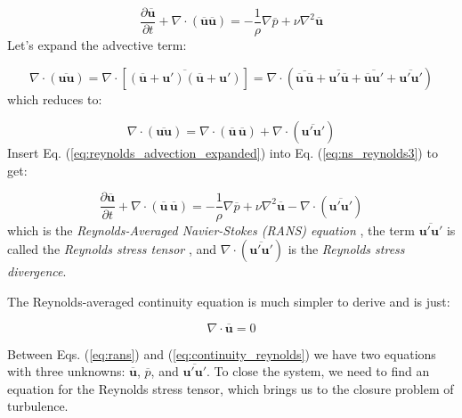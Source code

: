 \documentclass[12pt]{article}
\numberwithin{equation}{section}
\numberwithin{figure}{section}
\numberwithin{table}{section}
\begin{document}
\begin{equation}
  \frac{\partial \overline{\mathbf{u}}}{\partial t} +
  \nabla \cdot (\overline{\mathbf{u}} \overline{\mathbf{u}}) =
  - \frac{1}{\rho} \nabla \overline{p} + \nu \nabla^2 \overline{\mathbf{u}}
\end{equation}
Let's expand the advective term:

\begin{equation}
   \nabla \cdot (\overline{\mathbf{u} {\mathbf{u}}}) =
   \nabla \cdot [\overline{(\overline{\mathbf{u}} + \mathbf{u}')(\overline{\mathbf{u}} + \mathbf{u}')}] =
   \nabla \cdot (\overline{\overline{\mathbf{u}}\, \overline{\mathbf{u}}} + \overline{\mathbf{u}' \overline{\mathbf{u}}} + \overline{\overline{\mathbf{u}} \mathbf{u}'} + \overline{\mathbf{u}' \mathbf{u}'})
\end{equation}
which reduces to:

\begin{equation}
  \nabla \cdot (\overline{\mathbf{u} \mathbf{u}}) =
  \nabla \cdot (\overline{\mathbf{u}}\, \overline{\mathbf{u}}) + \nabla \cdot (\overline{\mathbf{u}' \mathbf{u}'})
  \label{eq:reynolds_advection_expanded}
\end{equation}
Insert Eq. (\ref{eq:reynolds_advection_expanded}) into Eq. (\ref{eq:ns_reynolds3}) to get:

\begin{equation}
  \frac{\partial \overline{\mathbf{u}}}{\partial t} +
  \nabla \cdot (\overline{\mathbf{u}}\, \overline{\mathbf{u}}) =
  - \frac{1}{\rho} \nabla \overline{p} +
  \nu \nabla^2 \overline{\mathbf{u}}
  - \nabla \cdot (\overline{\mathbf{u}' \mathbf{u}'})
  \label{eq:rans}
\end{equation}
which is the \textit{Reynolds-Averaged Navier-Stokes (RANS) equation}
, the term
$\overline{\mathbf{u}' \mathbf{u}'}$ is called the \textit{Reynolds stress tensor}
,
and $\nabla \cdot (\overline{\mathbf{u}' \mathbf{u}'})$ is the
\textit{Reynolds stress divergence}.

The Reynolds-averaged continuity equation is much simpler to derive and is
just:

\begin{equation}
  \nabla \cdot \overline{\mathbf{u}} = 0
  \label{eq:continuity_reynolds}
\end{equation}

Between Eqs. (\ref{eq:rans}) and (\ref{eq:continuity_reynolds}) we have
two equations with three unknowns: $\overline{\mathbf{u}}$, $\overline{p}$, and
$\overline{\mathbf{u}' \mathbf{u}'}$.
To close the system, we need to find an equation for the Reynolds stress tensor,
which brings us to the closure problem of turbulence.
\end{document}
